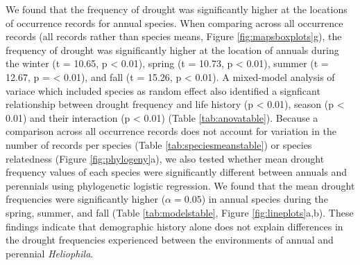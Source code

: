 \documentclass[man,floatsintext]{apa6}
\theoremstyle{definition}
\theoremstyle{definition}
\theoremstyle{definition}
\theoremstyle{remark}
\begin{document}
We found that the frequency of drought was significantly higher at the
locations of occurrence records for annual species. When comparing
across all occurrence records (all records rather than species means,
Figure \ref{fig:mapsboxplots}g), the frequency of drought was
significantly higher at the location of annuals during the winter (t =
10.65, p \textless{} 0.01), spring (t = 10.73, p \textless{} 0.01),
summer (t = 12.67, p = \textless{} 0.01), and fall (t = 15.26, p
\textless{} 0.01). A mixed-model analysis of variace which included
species as random effect also identified a signficant relationship
between drought frequency and life history (p \textless{} 0.01), season
(p \textless{} 0.01) and their interaction (p \textless{} 0.01) (Table
\ref{tab:anovatable}). Because a comparison across all occurrence
records does not account for variation in the number of records per
species (Table \ref{tab:speciesmeanstable}) or species relatedness
(Figure \ref{fig:phylogeny}a), we also tested whether mean drought
frequency values of each species were significantly different between
annuals and perennials using phylogenetic logistic regression. We found
that the mean drought frequencies were significantly higher
(\(\alpha = 0.05\)) in annual species during the spring, summer, and
fall (Table \ref{tab:modelstable}, Figure \ref{fig:lineplots}a,b). These
findings indicate that demographic history alone does not explain
differences in the drought frequencies experienced between the
environments of annual and perennial \emph{Heliophila}.
\end{document}
